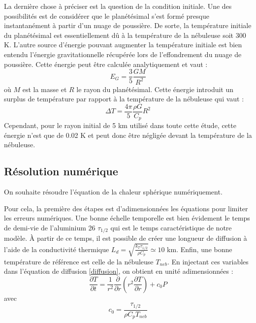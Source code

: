 \documentclass[10pt,a4paper]{article}
\numberwithin{equation}{section}
\begin{document}
La dernière chose à préciser est la question de la condition initiale. Une des possibilités est de considérer que le planétésimal s'est formé presque instantanément à partir d'un nuage de poussière. De sorte, la température initiale du planétésimal est essentiellement dû à la température de la nébuleuse soit 300 K. L'autre source d'énergie pouvant augmenter la température initiale est bien entendu l'énergie gravitationnelle récupérée lors de l'effondrement du nuage de poussière. Cette énergie peut être calculée analytiquement et vaut :
\begin{equation}
E_{G} = \frac{3}{5}\frac{GM}{R^2}
\end{equation}
où $M$ est la masse et $R$ le rayon du planétésimal. Cette énergie introduit un surplus de température par rapport à la température de la nébuleuse qui vaut :
\begin{equation}
\Delta T = \frac{4 \pi}{5}\frac{\rho G}{C_p}R^2
\end{equation}
Cependant, pour le rayon initial de 5 km utilisé dans toute cette étude, cette énergie n'est que de 0.02 K et peut donc être négligée devant la température de la nébuleuse.


\subsection{Résolution numérique}

On souhaite résoudre l'équation de la chaleur sphérique numériquement. 
\medskip

Pour cela, la première des étapes est d'adimensionnées les équations pour limiter les erreurs numériques. Une bonne échelle temporelle est bien évidement le temps de demi-vie de l'aluminium 26 $\tau_{1/2}$ qui est le temps caractéristique de notre modèle. \`A partir de ce temps, il est possible de créer une longueur de diffusion à l'aide de la conductivité thermique $L_d = \sqrt{\frac{k_T \tau_{1/2}}{\rho C_p} } \simeq 10$ km. Enfin, une bonne température de référence est celle de la nébuleuse $T_{neb}$.
En injectant ces variables dans l'équation de diffusion \ref{diffusion}, on obtient en unité adimensionnées :
\begin{equation}
\dfrac{\partial T}{\partial t} = \frac{1}{r^2} \dfrac{\partial }{\partial r}\left( r^2 \dfrac{\partial T}{\partial r} \right) + c_0P
\label{diffusion_adim}
\end{equation}
avec 
\begin{equation}
c_0 = \frac{\tau_{1/2}}{\rho C_p T_{neb}}
\end{equation}
\end{document}
